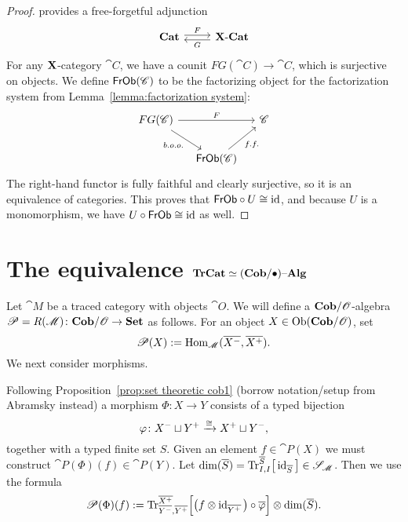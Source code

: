 \documentclass[12pt,oneside,article,draft]{memoir}
\begin{document}
\begin{proof}

\cite{Abramsky} provides a free-forgetful adjunction
$$
\begin{tikzcd}
\Cat{Cat}\arrow[r, shift left=.5ex, "F"]&\XCat\arrow[l, shift left=.5ex,"G"]
\end{tikzcd}
$$
For any $\mathbf{X}$-category $\cat{C}$, we have a counit $FG(\cat{C})\to\cat{C}$, which is surjective on objects. We define $\mathsf{FrOb}(\mathscr{C})$ to be the factorizing object for the factorization system from Lemma~\ref{lemma:factorization system}:
$$
\begin{tikzcd}[column sep=small]
FG(\cat{C})\arrow[dr, "b.o.o."']\arrow[rr, "F"]&&\cat{C}\\
&\Fun{FrOb}(\cat{C})\arrow[ur, "f.f."']
\end{tikzcd}
$$
The right-hand functor is fully faithful and clearly surjective, so it is an equivalence of categories. This proves that $\mathsf{FrOb}\circ U\cong\operatorname{id}$, and because $U$ is a monomorphism, we have $U\circ\mathsf{FrOb}\cong\operatorname{id}$ as well.


\end{proof}

\section{The equivalence $\mathbf{TrCat}\simeq(\mathbf{Cob}/\bullet){\text \textendash}\mathbf{Alg}$}\label{sec:first equivalence}

Let $\cat{M}$ be a traced category with objects $\cat{O}$. We will define a $\mathbf{Cob}/\mathscr{O}$-algebra $\mathscr{P}=R(\mathscr{M})\colon\mathbf{Cob}/\mathscr{O}\to\mathbf{Set}$ as follows. For an object $X\in\operatorname{Ob}(\mathbf{Cob}/\mathscr{O})$, set 
$$\mathscr{P}(X):=\operatorname{Hom}_{\mathscr{M}}(\overline{X^-},\overline{X^+}).$$
We next consider morphisms.

Following Proposition~\ref{prop:set theoretic cob1} (borrow notation/setup from Abramsky instead) a morphism $\Phi\colon X\longrightarrow Y$ consists of a typed bijection 
$$\varphi\colon X^-\sqcup Y^+\xrightarrow{\cong}X^+\sqcup Y^-,$$ 
together with a typed finite set $S$. Given an element $f\in\cat{P}(X)$ we must construct $\cat{P}(\Phi)(f)\in\cat{P}(Y)$. Let $\dim(\overline{S})=\textnormal{Tr}^{\overline{S}}_{I,I}\big[\operatorname{id}_{\overline{S}}\big]\in\mathscr{S}_{\mathscr{M}}$. Then we use the formula
$$\mathscr{P}(\Phi)(f):=
\textnormal{Tr}^{\overline{X^+}}_{\overline{Y^-},\overline{Y^+}}\Big[\big(f\otimes\operatorname{id}_{\overline{Y^+}}\big)\circ\overline{\varphi}\Big]
\otimes\dim(\overline{S}).	
$$
\end{document}
